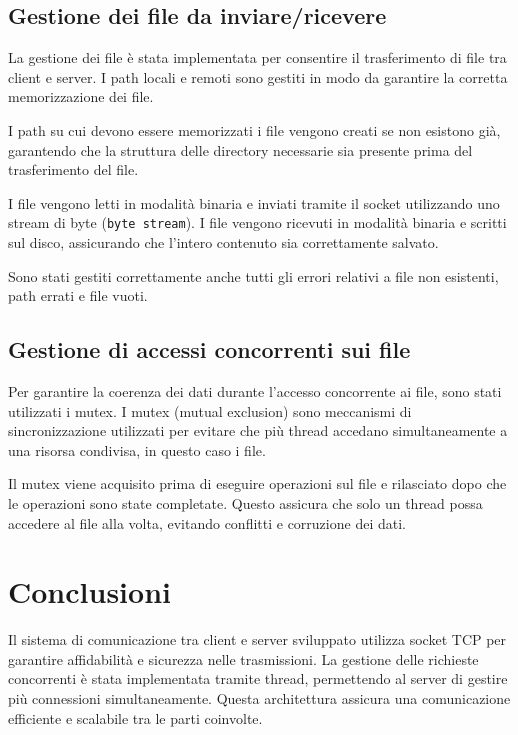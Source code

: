 \subsection{Gestione dei file da inviare/ricevere}
La gestione dei file è stata implementata per consentire il trasferimento di file tra client e server. I path locali e remoti sono gestiti in modo da garantire la corretta memorizzazione dei file.

I path su cui devono essere memorizzati i file vengono creati se non esistono già, garantendo che la struttura delle directory necessarie sia presente prima del trasferimento del file. 

I file vengono letti in modalità binaria e inviati tramite il socket utilizzando uno stream di byte (\texttt{byte stream}).
I file vengono ricevuti in modalità binaria e scritti sul disco, assicurando che l'intero contenuto sia correttamente salvato.

Sono stati gestiti correttamente anche tutti gli errori relativi a file non esistenti, path errati e file vuoti.

\subsection{Gestione di accessi concorrenti sui file}
Per garantire la coerenza dei dati durante l'accesso concorrente ai file, sono stati utilizzati i mutex.  I mutex (mutual exclusion) sono meccanismi di sincronizzazione utilizzati per evitare che più thread accedano simultaneamente a una risorsa condivisa, in questo caso i file.

Il mutex viene acquisito prima di eseguire operazioni sul file e rilasciato dopo che le operazioni sono state completate. Questo assicura che solo un thread possa accedere al file alla volta, evitando conflitti e corruzione dei dati.

\section{Conclusioni}
Il sistema di comunicazione tra client e server sviluppato utilizza socket TCP per garantire affidabilità e sicurezza nelle trasmissioni. La gestione delle richieste concorrenti è stata implementata tramite thread, permettendo al server di gestire più connessioni simultaneamente. Questa architettura assicura una comunicazione efficiente e scalabile tra le parti coinvolte.
